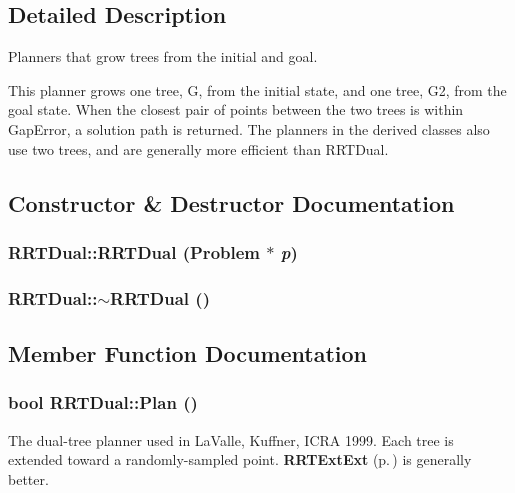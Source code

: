 \subsection{Detailed Description}
Planners that grow trees from the initial and goal.

This planner grows one tree, G, from the initial state,  and one tree, G2, from the goal state. When the closest pair of points between the two trees is within Gap\-Error, a solution path is returned. The planners in the derived classes also use two trees, and are generally more efficient than RRTDual. 



\subsection{Constructor \& Destructor Documentation}
\subsubsection{\setlength{\rightskip}{0pt plus 5cm}RRTDual::RRTDual ({\bf Problem} $\ast$ {\em p})}\label{classRRTDual_a0}


\subsubsection{\setlength{\rightskip}{0pt plus 5cm}RRTDual::$\sim$RRTDual ()\hspace{0.3cm}{\tt  [inline, virtual]}}\label{classRRTDual_a1}




\subsection{Member Function Documentation}
\subsubsection{\setlength{\rightskip}{0pt plus 5cm}bool RRTDual::Plan ()\hspace{0.3cm}{\tt  [virtual]}}\label{classRRTDual_a2}


The dual-tree planner used in La\-Valle, Kuffner, ICRA 1999. Each tree is extended toward a randomly-sampled point. {\bf RRTExt\-Ext} {\rm (p.\,\pageref{classRRTExtExt})} is generally better.



